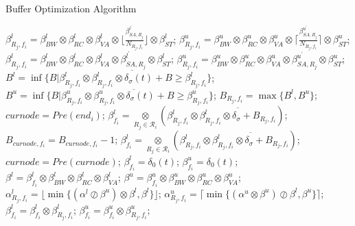 \documentclass[10pt,journal]{IEEEtran}
\begin{document}
\begin{algorithm}
\caption{Buffer Optimization Algorithm}
\label{alg:bufopt}
\begin{algorithmic}[1]
                \STATE $\beta_{R_j,f_i}^l=\beta_{BW}^l\otimes\beta_{RC}^l\otimes\beta_{VA}^l\otimes\lfloor\frac{\beta_{SA,R_j}^{l^\prime}}{N_{R_j,f_i}}\rfloor\otimes\beta_{ST}^l$;
                \STATE $\beta_{R_j,f_i}^u=\beta_{BW}^u\otimes\beta_{RC}^u\otimes\beta_{VA}^u\otimes\lceil\frac{\beta_{SA,R_j}^{u^\prime}}{N_{R_j,f_i}}\rceil\otimes\beta_{ST}^u$;
            \ELSE
                \STATE $\beta_{R_j,f_i}^l=\beta_{BW}^l\otimes\beta_{RC}^l\otimes\beta_{VA}^l\otimes\beta_{SA,R_j}^{l^\prime}\otimes\beta_{ST}^l$;
                \STATE $\beta_{R_j,f_i}^u=\beta_{BW}^u\otimes\beta_{RC}^u\otimes\beta_{VA}^u\otimes\beta_{SA,R_j}^{u^\prime}\otimes\beta_{ST}^u$;
            \ENDIF
            \STATE $B^l=\inf\{B|\beta_{R_j,f_i}^l\otimes\overline{\beta_{R_j,f_i}^l\otimes\delta_\sigma(t)+B}\geq\beta_{R_j,f_i}^l\}$;
            \STATE $B^u=\inf\{B|\beta_{R_j,f_i}^u\otimes\overline{\beta_{R_j,f_i}^u\otimes\delta_\sigma(t)+B}\geq\beta_{R_j,f_i}^u\}$;
            \STATE $B_{R_j,f_i}=\max\{B^l,B^u\}$;
        \ENDFOR
        \STATE $curnode=Pre(end_i)$;
            \STATE $\beta_{f_i}^l=\underset{R_{j}\in\mathcal{R}_i}{\otimes}(\beta^l_{R_j,f_i}\otimes\overline{\beta^l_{R_j,f_i}\otimes\delta_\sigma+B_{R_j,f_i}})$;
                \STATE $B_{curnode,f_i}=B_{curnode,f_i}-1$;
                \STATE $\beta_{f_i}^l=\underset{R_{j}\in\mathcal{R}_i}{\otimes}(\beta^l_{R_j,f_i}\otimes\overline{\beta^l_{R_j,f_i}\otimes\delta_\sigma+B_{R_j,f_i}})$;
            \ENDWHILE
            \STATE $curnode=Pre(curnode)$;
        \ENDWHILE
        \STATE $\beta_{f_i}^l=\delta_0(t)$; $\beta_{f_i}^u=\delta_0(t)$;
            \STATE $\beta^l=\beta^l_{f_i}\otimes\beta_{BW}^l\otimes\beta_{RC}^l\otimes\beta_{VA}^l$;
            \STATE $\beta^u=\beta^u_{f_i}\otimes\beta_{BW}^u\otimes\beta_{RC}^u\otimes\beta_{VA}^u$;
            \STATE $\alpha^l_{R_j,f_i}=\lfloor\min\{(\alpha^l\oslash\beta^u)\otimes\beta^l,\beta^l\}\rfloor$;
            \STATE $\alpha^u_{R_j,f_i}=\lceil\min\{(\alpha^u\otimes\beta^u)\oslash\beta^l,\beta^u\}\rceil$;
            \STATE $\beta_{f_i}^l=\beta_{f_i}^l\otimes\beta_{R_j,f_i}^l$; $\beta_{f_i}^u=\beta_{f_i}^u\otimes\beta_{R_j,f_i}^u$;

\end{algorithmic}
\end{algorithm}
\end{document}
